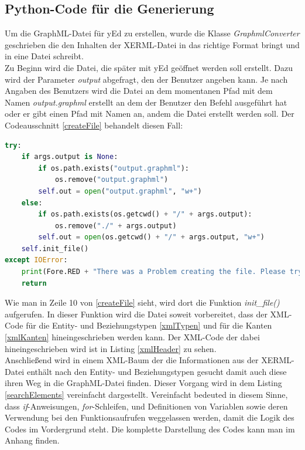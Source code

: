 \subsection{Python-Code für die Generierung}

Um die GraphML-Datei für yEd zu erstellen, wurde die Klasse \textit{GraphmlConverter} geschrieben die den Inhalten der XERML-Datei in das richtige Format bringt und in eine Datei schreibt.
\\

\noindent
Zu Beginn wird die Datei, die später mit yEd geöffnet werden soll erstellt. Dazu wird der Parameter \textit{output} abgefragt, den der Benutzer angeben kann. Je nach Angaben des Benutzers wird die Datei an dem momentanen Pfad mit dem Namen \textit{output.graphml} erstellt an dem der Benutzer den Befehl ausgeführt hat oder er gibt einen Pfad mit Namen an, andem die Datei erstellt werden soll. Der Codeausschnitt \ref{createFile} behandelt diesen Fall:


\begin{lstlisting}[language=Python,label={createFile},caption={Codeausschnitt für die Erstellung der GraphML-Datei}]
try:
	if args.output is None:
		if os.path.exists("output.graphml"):
			os.remove("output.graphml")
		self.out = open("output.graphml", "w+")
	else:
		if os.path.exists(os.getcwd() + "/" + args.output):
			os.remove("./" + args.output)
		self.out = open(os.getcwd() + "/" + args.output, "w+")
	self.init_file()
except IOError:
	print(Fore.RED + "There was a Problem creating the file. Please try again" + Fore.RESET)
	return
\end{lstlisting}

\prc
\noindent
Wie man in Zeile 10 von \ref{createFile} sieht, wird dort die Funktion \textit{init\_file()} aufgerufen. In dieser Funktion wird die Datei soweit vorbereitet, dass der XML-Code für die Entity- und Beziehungstypen \ref{xmlTypen} und für die Kanten \ref{xmlKanten} hineingeschrieben werden kann. Der XML-Code der dabei hineingeschrieben wird ist in Listing \ref{xmlHeader} zu sehen.
\\

\noindent
Anschließend wird in einem XML-Baum der die Informationen aus der XERML-Datei enthält nach den Entity- und Beziehungstypen gesucht damit auch diese ihren Weg in die GraphML-Datei finden. Dieser Vorgang wird in dem Listing \ref{searchElements} vereinfacht dargestellt. Vereinfacht bedeuted in diesem Sinne, dass \textit{if}-Anweisungen, \textit{for}-Schleifen, und Definitionen von Variablen sowie deren Verwendung bei den Funktionsaufrufen weggelassen werden, damit die Logik des Codes im Vordergrund steht. Die komplette Darstellung des Codes kann man im Anhang finden.
\\

